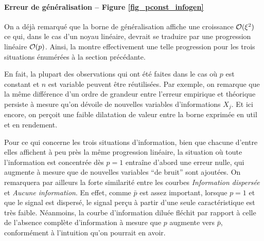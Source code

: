 \paragraph{Erreur de généralisation -- Figure \ref{fig_pconst_infogen}}

On a déjà remarqué que la borne de généralisation affiche une croissance $\mathcal O(\xi^2)$
ce qui, dans le cas d'un noyau linéaire, devrait se traduire par une progression linéaire
$\mathcal O(p)$. Ainsi, la  montre effectivement une telle
progression pour les trois situations énumérées à la section précédante. 

En fait, la plupart des observations qui ont été faites dans le cas où $p$ est constant et
$n$ est variable peuvent être réutilisées. Par exemple, on remarque que la même différence
d'un ordre de grandeur entre l'erreur empirique et théorique persiste à mesure qu'on
dévoile de nouvelles variables d'informations $X_j$. Et ici encore, on perçoit une faible
dilatation de valeur entre la borne exprimée en util et en rendement.

Pour ce qui concerne les trois situations d'information, bien que chacune d'entre elles
affichent à peu près la même progression linéaire, la situation où toute l'information est
concentrée dès $p=1$ entraîne d'abord une erreur nulle, qui augmente à mesure que de
nouvelles variables ``de bruit'' sont ajoutées. On remarquera par ailleurs la forte
similarité entre les courbes \textit{Information dispersée} et \textit{Aucune
  information}. En effet, comme $\bar p$ est assez important, lorsque $p=1$ et que le
signal est dispersé, le signal perçu à partir d'une seule caractéristique est très
faible. Néanmoins, la courbe d'information diluée fléchit par rapport à celle de l'absence
complète d'information à mesure que $p$ augmente vers $\bar p$, conformément à l'intuition
qu'on pourrait en avoir.

\newpage

